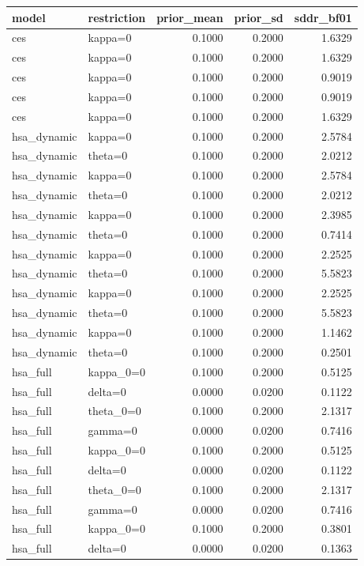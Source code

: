 \begin{tabular}{llrrr}
\toprule
model & restriction & prior\_mean & prior\_sd & sddr\_bf01 \\
\midrule
ces & kappa=0 & 0.1000 & 0.2000 & 1.6329 \\
ces & kappa=0 & 0.1000 & 0.2000 & 1.6329 \\
ces & kappa=0 & 0.1000 & 0.2000 & 0.9019 \\
ces & kappa=0 & 0.1000 & 0.2000 & 0.9019 \\
ces & kappa=0 & 0.1000 & 0.2000 & 1.6329 \\
hsa\_dynamic & kappa=0 & 0.1000 & 0.2000 & 2.5784 \\
hsa\_dynamic & theta=0 & 0.1000 & 0.2000 & 2.0212 \\
hsa\_dynamic & kappa=0 & 0.1000 & 0.2000 & 2.5784 \\
hsa\_dynamic & theta=0 & 0.1000 & 0.2000 & 2.0212 \\
hsa\_dynamic & kappa=0 & 0.1000 & 0.2000 & 2.3985 \\
hsa\_dynamic & theta=0 & 0.1000 & 0.2000 & 0.7414 \\
hsa\_dynamic & kappa=0 & 0.1000 & 0.2000 & 2.2525 \\
hsa\_dynamic & theta=0 & 0.1000 & 0.2000 & 5.5823 \\
hsa\_dynamic & kappa=0 & 0.1000 & 0.2000 & 2.2525 \\
hsa\_dynamic & theta=0 & 0.1000 & 0.2000 & 5.5823 \\
hsa\_dynamic & kappa=0 & 0.1000 & 0.2000 & 1.1462 \\
hsa\_dynamic & theta=0 & 0.1000 & 0.2000 & 0.2501 \\
hsa\_full & kappa\_0=0 & 0.1000 & 0.2000 & 0.5125 \\
hsa\_full & delta=0 & 0.0000 & 0.0200 & 0.1122 \\
hsa\_full & theta\_0=0 & 0.1000 & 0.2000 & 2.1317 \\
hsa\_full & gamma=0 & 0.0000 & 0.0200 & 0.7416 \\
hsa\_full & kappa\_0=0 & 0.1000 & 0.2000 & 0.5125 \\
hsa\_full & delta=0 & 0.0000 & 0.0200 & 0.1122 \\
hsa\_full & theta\_0=0 & 0.1000 & 0.2000 & 2.1317 \\
hsa\_full & gamma=0 & 0.0000 & 0.0200 & 0.7416 \\
hsa\_full & kappa\_0=0 & 0.1000 & 0.2000 & 0.3801 \\
hsa\_full & delta=0 & 0.0000 & 0.0200 & 0.1363 \\

\end{tabular}
